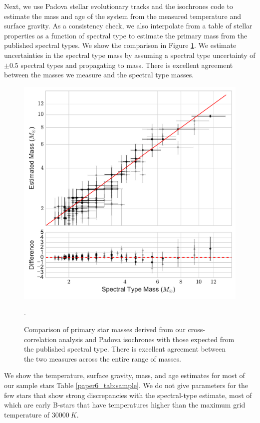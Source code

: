 Next, we use Padova stellar evolutionary tracks \citep{Bressan2012} and the isochrones code \citep{isochrones_code} to estimate the mass and age of the system from the measured temperature and surface gravity. As a consistency check, we also interpolate from a table of stellar properties as a function of spectral type \citep{Pecaut2013} to estimate the primary mass from the published spectral types. We show the comparison in Figure \ref{paper6_fig:prim_mass}. We estimate uncertainties in the spectral type mass by assuming a spectral type uncertainty of $\pm 0.5$ spectral types and propagating to mass. There is excellent agreement between the masses we measure and the spectral type masses.

\begin{figure}[t]
\includegraphics[width=\columnwidth]{Figures/paper6_PrimaryMassEstimates_log.pdf}
\caption{Comparison of primary star masses derived from our cross-correlation analysis and Padova isochrones \citep{Bressan2012} with those expected from the published spectral type. There is excellent agreement between the two measures across the entire range of masses.}
\label{paper6_fig:prim_mass}.
\end{figure}

We show the temperature, surface gravity, mass, and age estimates for most of our sample stars Table \ref{paper6_tab:sample}. We do not give parameters for the few stars that show strong discrepancies with the spectral-type estimate, most of which are early B-stars that have temperatures higher than the maximum grid temperature of $30000\ K$. 





